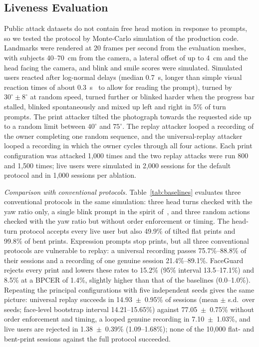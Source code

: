 \documentclass{ieeeaccess}
\begin{document}
\subsection{Liveness Evaluation}\label{sec:liveres}
Public attack datasets do not contain free head motion in response to prompts, so we tested the protocol by Monte-Carlo simulation of the production code. Landmarks were rendered at 20 frames per second from the evaluation meshes, with subjects 40--70~cm from the camera, a lateral offset of up to 4~cm and the head facing the camera, and blink and smile scores were simulated. Simulated users reacted after log-normal delays (median 0.7~s, longer than simple visual reaction times of about 0.3~s~\cite{tatsuno2016reaction} to allow for reading the prompt), turned by $30^\circ\pm8^\circ$ at random speed, turned further or blinked harder when the progress bar stalled, blinked spontaneously and mixed up left and right in 5\% of turn prompts. The print attacker tilted the photograph towards the requested side up to a random limit between $40^\circ$ and $75^\circ$. The replay attacker looped a recording of the owner completing one random sequence, and the universal-replay attacker looped a recording in which the owner cycles through all four actions. Each print configuration was attacked 1,000 times and the two replay attacks were run 800 and 1,500 times; live users were simulated in 2,000 sessions for the default protocol and in 1,000 sessions per ablation.

\emph{Comparison with conventional protocols.} Table~\ref{tab:baselines} evaluates three conventional protocols in the same simulation: three head turns checked with the yaw ratio only, a single blink prompt in the spirit of~\cite{pan2007eyeblink}, and three random actions checked with the yaw ratio but without order enforcement or timing. The head-turn protocol accepts every live user but also 49.9\% of tilted flat prints and 99.8\% of bent prints. Expression prompts stop prints, but all three conventional protocols are vulnerable to replay: a universal recording passes 75.7\%--88.8\% of their sessions and a recording of one genuine session 21.4\%--89.1\%. FaceGuard rejects every print and lowers these rates to 15.2\% (95\% interval 13.5--17.1\%) and 8.5\% at a BPCER of 1.4\%, slightly higher than that of the baselines (0.0--1.0\%). Repeating the principal configurations with five independent seeds gives the same picture: universal replay succeeds in 14.93~$\pm$~0.95\% of sessions (mean $\pm$ s.d.\ over seeds; face-level bootstrap interval 14.21--15.65\%) against 77.05~$\pm$~0.75\% without order enforcement and timing, a looped genuine recording in 7.10~$\pm$~1.03\%, and live users are rejected in 1.38~$\pm$~0.39\% (1.09--1.68\%); none of the 10,000 flat- and bent-print sessions against the full protocol succeeded.
\end{document}
